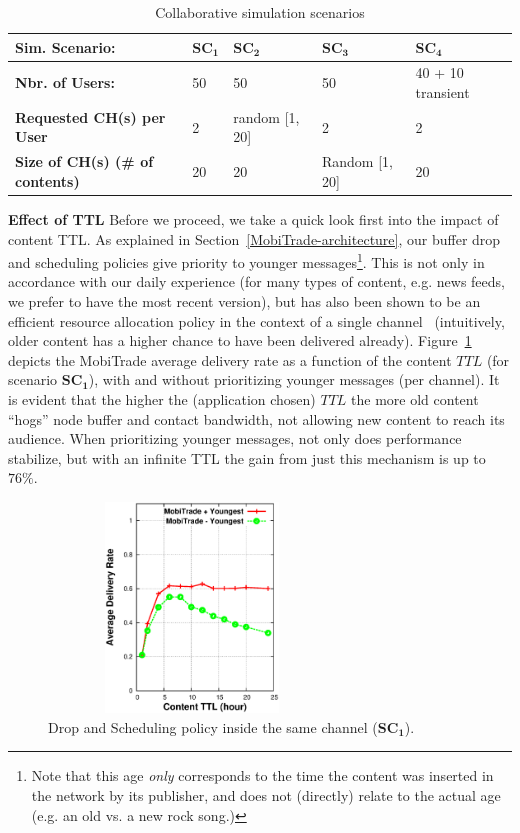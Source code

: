 \begin{table}[!h]
\caption{Collaborative simulation scenarios}
\centering
\label{table:c-sim-sce}
\footnotesize
\begin{tabular}{|p{3cm}|p{2cm}|p{2cm}|p{2cm}|p{2cm}|}
\hline
\bfseries Sim. Scenario: & $\mathbf{SC_1}$ & $\mathbf{SC_2}$ & $\mathbf{SC_3}$&  $\mathbf{SC_4}$ \\
\hline
\bfseries Nbr. of Users: & 50 & 50 & 50 & 40 + 10 transient\\
\hline
\bfseries Requested CH(s) per User & 2 & random [1, 20]& 2& 2\\
\hline
\bfseries Size of CH(s) (\# of contents) &20  &20 &Random [1, 20]&20 \\
\hline
\end{tabular}
\end{table}

\textbf{Effect of TTL} Before we proceed, we take a quick look first into the impact of content TTL. As explained in Section~\ref{MobiTrade-architecture}, our buffer drop and scheduling policies give priority to younger messages\footnote{Note that this age \emph{only} corresponds to the time the content was inserted in the network by its publisher, and does not (directly) relate to the actual age (e.g. an old vs. a new rock song.)}. This is not only in accordance with our daily experience (for many types of content, e.g. news feeds, we prefer to have the most recent version), but has also been shown to be an efficient resource allocation policy in the context of a single channel~\cite{TMC:Report} (intuitively, older content has a higher chance to have been delivered already). Figure~\ref{DO} depicts the MobiTrade average delivery rate as a function of the content $TTL$ (for scenario $\mathbf{SC_1}$), with and without prioritizing younger messages (per channel). It is evident that the higher the (application chosen) $TTL$ the more old content ``hogs'' node buffer and contact bandwidth, not allowing new content to reach its audience. When prioritizing younger messages, not only does performance stabilize, but with an infinite TTL the gain from just this mechanism is up to $76\%$.

\begin{figure}[!h]
  \begin{center}
    \includegraphics[width=3in,height=2.2in]{Chapitre5/fig3.eps}
  \end{center}
  \caption{Drop and Scheduling policy inside the same channel ($\mathbf{SC_1}$).}
  \label{DO}
\end{figure}


